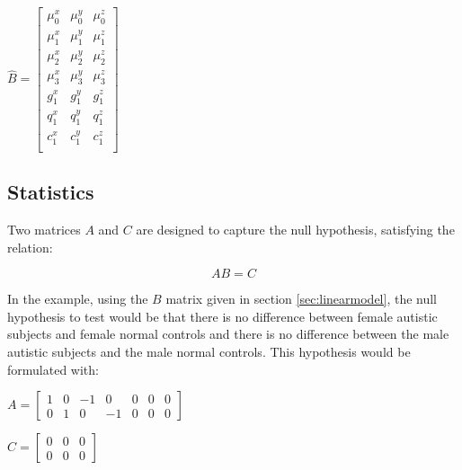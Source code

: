 \documentclass{InsightArticle}
\begin{document}
\begin{center}
$\hat{B} = \left[ \begin{array}{ccc} \mu^x_0 & \mu^y_0 & \mu^z_0 \\ \mu^x_1 & \mu^y_1 & \mu^z_1 \\ \mu^x_2 & \mu^y_2 & \mu^z_2 \\ \mu^x_3 & \mu^y_3 & \mu^z_3 \\ g^x_1 & g^y_1 & g^z_1 \\ q^x_1 & q^y_1 & q^z_1 \\ c^x_1 & c^y_1 & c^z_1 \\   \end{array} \right]$
\end{center}


\subsection{Statistics}
\label{sec:stats}

Two matrices $A$ and $C$ are designed to capture the null hypothesis,  satisfying the relation:

\begin{equation}
\label{eq:ABC}
AB = C
\end{equation}

In the example, using the $B$ matrix given in section \ref{sec:linearmodel}, the null hypothesis to test would be that there is no difference between female autistic subjects and female normal controls and there is no difference between the male autistic subjects and the male normal controls. This hypothesis would be formulated with:

\vspace{.1 in}

\begin{center}
$A = \left[ \begin{array}{ccccccc} 1 & 0 & -1 & 0 & 0 & 0 & 0 \\ 0 & 1 & 0 & -1 & 0 & 0 & 0   \end{array} \right]$
\end{center}
\vspace{.1 in}

\begin{center}
$C = \left[ \begin{array}{ccc}  0 & 0 & 0 \\ 0 & 0 & 0   \end{array} \right]$
\end{center}
\vspace{.1 in}
\end{document}
